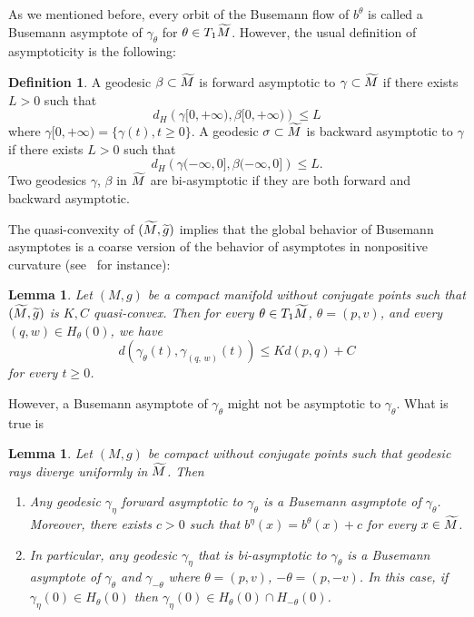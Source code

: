 \documentclass[10pt]{amsart}
\newtheorem{lemm}[cdrthm]{Lemma}
\theoremstyle{definition}
\newtheorem{defi}[cdrthm]{Definition}
\let\oldtilde\tilde
\renewcommand*{\tilde}[1]{\mathchoice{\widetilde{#1}}{\widetilde{#1}}{\oldtilde{#1}}{\oldtilde{#1}}}
\begin{document}
As we mentioned before, every orbit of the Busemann flow of $b^{\theta}$ is called a Busemann asymptote of $\gamma_{\theta}$ for $\theta \in T_{1}\tilde{M}$. However, the usual definition of asymptoticity is the following:

\begin{defi}
A geodesic $\beta \subset \tilde{M}$ is forward asymptotic to $\gamma \subset \tilde{M}$ if there exists $L>0$ such that
\[
d_{H}\left(\gamma[0,+\infty), \beta[0,+\infty)\right) \leq L
\]
where $\gamma[0,+\infty) = \{ \gamma(t), t \geq 0\}$. A geodesic $\sigma \subset \tilde{M}$ is backward asymptotic to $\gamma$ if there exists $L>0$ such that
\[
d_{H}\left(\gamma(-\infty,0], \beta(-\infty,0]\right) \leq L.
\]
Two geodesics $\gamma$, $\beta$ in $\tilde{M}$ are bi-asymptotic if they are both forward and backward asymptotic.
\end{defi}

The quasi-convexity of $(\tilde{M}, \tilde{g})$ implies that the global behavior of Busemann asymptotes is a coarse version of the behavior of asymptotes in nonpositive curvature (see~\cite{kn:Ruggiero-Ensaios} for instance):

\begin{lemm}\label{asymptotic-quasi-convex}
Let $(M,g)$ be a compact manifold without conjugate points such that $(\tilde{M}, \tilde{g})$ is $K,C$ quasi-convex. Then for every $\theta \in T_{1}\tilde{M}$, $\theta= (p,v)$, and every $(q, w) \in H_{\theta}(0)$, we have
\[
d\left(\gamma_{\theta}(t), \gamma_{(q,\,w)}(t)\right) \leq Kd(p,q) +C
\]
for every $ t \geq 0$.
\end{lemm}

However, a Busemann asymptote of $\gamma_{\theta}$ might not be asymptotic to $\gamma_{\theta}$. What is true is

\begin{lemm}\label{asymptotic-1}
Let $(M,g)$ be compact without conjugate points such that geodesic rays diverge uniformly in $\tilde{M}$. Then
\begin{enumerate}
\item \label{lemm2.10.1}Any geodesic $\gamma_{\eta}$ forward asymptotic to $\gamma_{\theta}$ is a Busemann asymptote of $\gamma_{\theta}$. Moreover, there exists $c>0$ such that $b^{\eta} (x) = b^{\theta}(x) +c$ for every $ x \in \tilde{M}$.
\item  \label{lemm2.10.2}In particular, any geodesic $\gamma_{\eta}$ that is bi-asymptotic to $\gamma_{\theta}$ is a Busemann asymptote of $\gamma_{\theta}$ and $\gamma_{-\theta}$ where $\theta = (p,v)$, $-\theta= (p,-v)$. In this case, if $\gamma_{\eta}(0) \in H_{\theta}(0)$ then $\gamma_{\eta}(0) \in H_{\theta}(0)\cap H_{-\theta}(0)$.
\end{enumerate}
\end{lemm}
\end{document}
